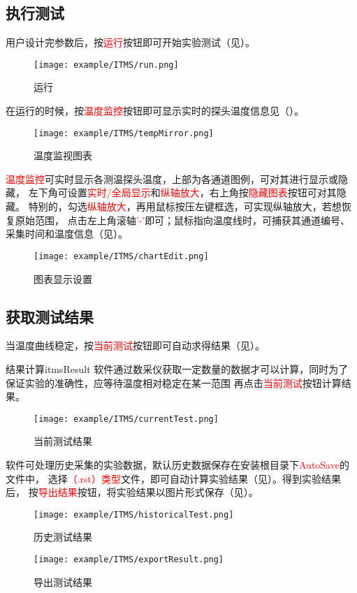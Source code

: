 \subsection{执行测试}
用户设计完参数后，按\textcolor{red}{运行}按钮即可开始实验测试（见）。
\begin{figure}[H]
	\centering
	\texttt{[image: example/ITMS/run.png]}
	\caption{ 运行 \label{fig:exmp_itms_run}}
\end{figure}
在运行的时候，按\textcolor{red}{温度监控}按钮即可显示实时的探头温度信息见（）。
\begin{figure}[H]
	\centering
	\texttt{[image: example/ITMS/tempMirror.png]}
	\caption{ 温度监视图表 \label{fig:exmp_itms_tempMirror}}
\end{figure}
\textcolor{red}{温度监控}可实时显示各测温探头温度，上部为各通道图例，可对其进行显示或隐藏，
左下角可设置\textcolor{red}{实时/全局显示}和\textcolor{red}{纵轴放大}，右上角按\textcolor{red}{隐藏图表}按钮可对其隐藏。
特别的，勾选\textcolor{red}{纵轴放大}，再用鼠标按压左键框选，可实现纵轴放大，若想恢复原始范围，
点击左上角滚轴\textcolor{red}{'-'}即可；鼠标指向温度线时，可捕获其通道编号、采集时间和温度信息（见）。\\
\begin{figure}[H]
	\centering
	\texttt{[image: example/ITMS/chartEdit.png]}
	\caption{ 图表显示设置 \label{fig:exmp_itms_chartEdit}}
\end{figure}

\subsection{获取测试结果}
	当温度曲线稳定，按\textcolor{red}{当前测试}按钮即可自动求得结果（见）。
\begin{tips}{结果计算}{itmsResult}
	软件通过数采仪获取一定数量的数据才可以计算，同时为了保证实验的准确性，应等待温度相对稳定在某一范围
再点击\textcolor{red}{当前测试}按钮计算结果。
\end{tips}
\begin{figure}[H]
	\centering
	\texttt{[image: example/ITMS/currentTest.png]}
	\caption{ 当前测试结果 \label{fig:exmp_itms_currentTest}}
\end{figure}
软件可处理历史采集的实验数据，默认历史数据保存在安装根目录下\textcolor{red}{AutoSave}的文件中，
选择\textcolor{red}{（.rst）类型}文件，即可自动计算实验结果（见）。得到实验结果后，
按\textcolor{red}{导出结果}按钮，将实验结果以图片形式保存（见）。
\begin{figure}[H]
	\centering
	\texttt{[image: example/ITMS/historicalTest.png]}
	\caption{ 历史测试结果 \label{fig:exmp_itms_historicalTest}}
\end{figure}

\begin{figure}[H]
	\centering
	\texttt{[image: example/ITMS/exportResult.png]}
	\caption{ 导出测试结果 \label{fig:exmp_itms_exportResult}}
\end{figure}